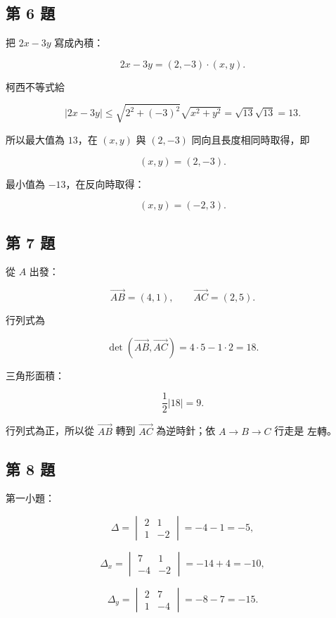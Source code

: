 \documentclass[11pt,a4paper]{article}
\begin{document}
\subsection{第 6 題}\label{ux7b2c-6-ux984c}

把 \(2x-3y\) 寫成內積：

\[
2x-3y=(2,-3)\cdot(x,y).
\]

柯西不等式給

\[
|2x-3y|
\le\sqrt{2^2+(-3)^2}\sqrt{x^2+y^2}
=\sqrt{13}\sqrt{13}
=13.
\]

所以最大值為 \(\boxed{13}\)，在 \((x,y)\) 與 \((2,-3)\) 同向且長度相同時取得，即

\[
\boxed{(x,y)=(2,-3)}.
\]

最小值為 \(\boxed{-13}\)，在反向時取得：

\[
\boxed{(x,y)=(-2,3)}.
\]

\subsection{第 7 題}\label{ux7b2c-7-ux984c}

從 \(A\) 出發：

\[
\overrightarrow{AB}=(4,1),
\qquad
\overrightarrow{AC}=(2,5).
\]

行列式為

\[
\det(\overrightarrow{AB},\overrightarrow{AC})
=4\cdot5-1\cdot2
=18.
\]

三角形面積：

\[
\boxed{\frac12|18|=9}.
\]

行列式為正，所以從 \(\overrightarrow{AB}\) 轉到 \(\overrightarrow{AC}\) 為逆時針；依 \(A\to B\to C\) 行走是 \(\boxed{\text{左轉}}\)。

\subsection{第 8 題}\label{ux7b2c-8-ux984c}

第一小題：

\[
\Delta=
\begin{vmatrix}
2&1\\
1&-2
\end{vmatrix}
=-4-1=-5,
\]

\[
\Delta_x=
\begin{vmatrix}
7&1\\
-4&-2
\end{vmatrix}
=-14+4=-10,
\]

\[
\Delta_y=
\begin{vmatrix}
2&7\\
1&-4
\end{vmatrix}
=-8-7=-15.
\]
\end{document}

